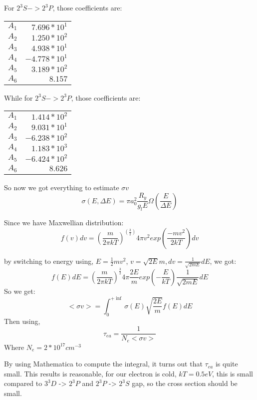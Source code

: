 For $2^3S -> 2^3P$, those coefficients are:

\begin{tabular}{ l | r }
  $A_1$ & $7.696 * 10^1$ \\
  $A_2$ & $1.250 * 10^2$ \\
  $A_3$ & $4.938 * 10^1$ \\
  $A_4$ & $-4.778 * 10^1$ \\
  $A_5$ & $3.189 * 10^2$ \\
  $A_6$ & $8.157$
\end{tabular}

While for $2^3S -> 2^3P$, those coefficients are:

\begin{tabular}{ l | r }
  $A_1$ & $1.414 * 10^2$ \\
  $A_2$ & $9.031 * 10^1$ \\
  $A_3$ & $-6.238 * 10^2$ \\
  $A_4$ & $1.183 * 10^3$ \\
  $A_5$ & $-6.424 * 10^2$ \\
  $A_6$ & $8.626$
\end{tabular}

So now we got everything to estimate $\sigma v$
\begin{equation}
\sigma(E,\Delta E) = \pi a_0^2 \frac{R_y}{g_l E}\Omega(\frac{E}{\Delta
E})
\end{equation}

Since we have Maxwellian distribution:
\begin{equation}
f(v) dv = (\frac{m}{2\pi k T})^(\frac{3}{2})4\pi v^2
exp(\frac{-mv^2}{2kT}) dv
\end{equation}

by switching to energy using, $E=\frac{1}{2}mv^2$, $v=\sqrt{2E}{m}, dv
=\frac{1}{\sqrt{2mE}}dE$, we got:
\begin{equation}
f(E)dE=(\frac{m}{2\pi k T})^{\frac{3}{2}}4\pi \frac{2E}{m} exp(-
\frac{E}{kT}) \frac{1}{\sqrt{2mE}} dE
\end{equation}
So we get:
\begin{equation}
<\sigma v> = \int_0^{+\inf} \sigma(E)\sqrt{\frac{2E}{m}}f(E)dE
\end{equation}
Then using,
\begin{equation}
\tau_{ea} = \frac{1}{N_e<\sigma v>}
\end{equation}
Where $N_e=2*10^{17}cm^{-3}$

By using Mathematica to compute the integral, it turns out that
$\tau_{ea}$ is quite small. This results is reasonable, for our
electron is cold, $kT=0.5eV$, this is small compared to $3^3D$ ->
$2^3P$ and $2^3P$ -> $2^3S$ gap, so the cross section should be small.

